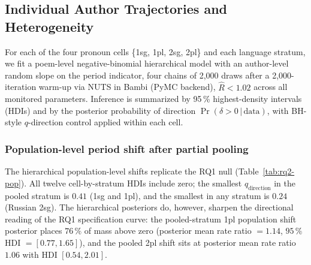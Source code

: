 \documentclass[12pt]{interact}
\theoremstyle{plain}%
\theoremstyle{definition}
\theoremstyle{remark}
\begin{document}
\subsection{Individual Author Trajectories and Heterogeneity }
\label{sec:results-rq2}

For each of the four pronoun cells \{1sg, 1pl, 2sg, 2pl\} and each language stratum, we fit a poem-level negative-binomial hierarchical model with an author-level random slope on the period indicator, four chains of 2{,}000 draws after a 2{,}000-iteration warm-up via NUTS in Bambi (PyMC backend), $\widehat{R} < 1.02$ across all monitored parameters. Inference is summarized by 95\,\% highest-density intervals (HDIs) and by the posterior probability of direction $\Pr(\delta > 0\,|\,\text{data})$, with BH-style $q$-direction control applied within each cell.

\subsubsection{Population-level period shift after partial pooling}

The hierarchical population-level shifts replicate the RQ1 null (Table~\ref{tab:rq2-pop}). All twelve cell-by-stratum HDIs include zero; the smallest $q_{\text{direction}}$ in the pooled stratum is $0.41$ (1sg and 1pl), and the smallest in any stratum is $0.24$ (Russian 2sg). The hierarchical posteriors do, however, sharpen the directional reading of the RQ1 specification curve: the pooled-stratum 1pl population shift posterior places $76\,\%$ of mass above zero (posterior mean rate ratio $= 1.14$, $95\,\%$ HDI $= [0.77, 1.65]$), and the pooled 2pl shift sits at posterior mean rate ratio $1.06$ with HDI $[0.54, 2.01]$.
\end{document}
